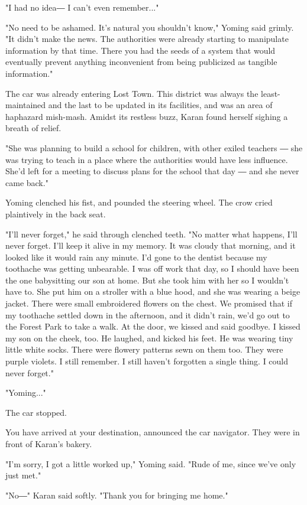 "I had no idea― I can't even remember..."

"No need to be ashamed. It's natural you shouldn't know," Yoming said
grimly. "It didn't make the news. The authorities were already starting
to manipulate information by that time. There you had the seeds of a
system that would eventually prevent anything inconvenient from being
publicized as tangible information."

The car was already entering Lost Town. This district was always the
least-maintained and the last to be updated in its facilities, and was
an area of haphazard mish-mash. Amidst its restless buzz, Karan found
herself sighing a breath of relief.

"She was planning to build a school for children, with other exiled
teachers ― she was trying to teach in a place where the authorities
would have less influence. She'd left for a meeting to discuss plans for
the school that day ― and she never came back."

Yoming clenched his fist, and pounded the steering wheel. The crow cried
plaintively in the back seat.

"I'll never forget," he said through clenched teeth. "No matter what
happens, I'll never forget. I'll keep it alive in my memory. It was
cloudy that morning, and it looked like it would rain any minute. I'd
gone to the dentist because my toothache was getting unbearable. I was
off work that day, so I should have been the one babysitting our son at
home. But she took him with her so I wouldn't have to. She put him on a
stroller with a blue hood, and she was wearing a beige jacket. There
were small embroidered flowers on the chest. We promised that if my
toothache settled down in the afternoon, and it didn't rain, we'd go out
to the Forest Park to take a walk. At the door, we kissed and said
goodbye. I kissed my son on the cheek, too. He laughed, and kicked his
feet. He was wearing tiny little white socks. There were flowery
patterns sewn on them too. They were purple violets. I still remember. I
still haven't forgotten a single thing. I could never forget."

"Yoming..."

The car stopped.

You have arrived at your destination, announced the car navigator. They
were in front of Karan's bakery.

"I'm sorry, I got a little worked up," Yoming said. "Rude of me, since
we've only just met."

"No―" Karan said softly. "Thank you for bringing me home."


